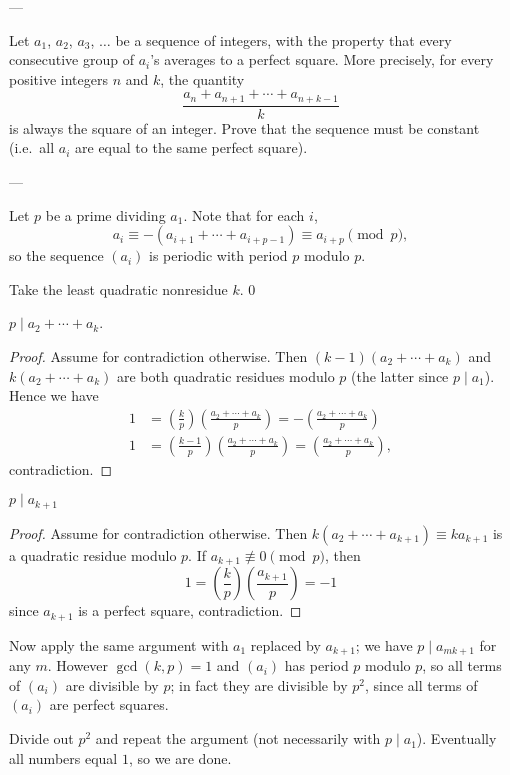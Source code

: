 
---

Let $a_1$, $a_2$, $a_3$, $\ldots$ be a sequence of integers, with the property that every consecutive group of $a_i$'s averages to a perfect square. More precisely, for every positive integers $n$ and $k$, the quantity \[\frac{a_n+a_{n+1}+\cdots+a_{n+k-1}}k\]
is always the square of an integer. Prove that the sequence must be constant (i.e.\ all $a_i$ are equal to the same perfect square).

---

Let $p$ be a prime dividing $a_1$. Note that for each $i$, \[a_i\equiv-(a_{i+1}+\cdots+a_{i+p-1})\equiv a_{i+p}\pmod p,\]
so the sequence $(a_i)$ is periodic with period $p$ modulo $p$.

Take the least quadratic nonresidue $k$.
\setcounter{iclaim}0
\begin{iclaim}
    $p\mid a_2+\cdots+a_k$.
\end{iclaim}
\begin{proof}
    Assume for contradiction otherwise. Then $(k-1)(a_2+\cdots+a_k)$ and $k(a_2+\cdots+a_k)$ are both quadratic residues modulo $p$ (the latter since $p\mid a_1$). Hence we have
    \begin{align*}
        1&=\left(\frac kp\right)\left(\frac{a_2+\cdots+a_k}p\right)=-\left(\frac{a_2+\cdots+a_k}p\right)\\
        1&=\left(\frac{k-1}p\right)\left(\frac{a_2+\cdots+a_k}p\right)=\left(\frac{a_2+\cdots+a_k}p\right),
    \end{align*}
    contradiction.
\end{proof}
\begin{iclaim}
    $p\mid a_{k+1}$
\end{iclaim}
\begin{proof}
    Assume for contradiction otherwise. Then $k(a_2+\cdots+a_{k+1})\equiv ka_{k+1}$ is a quadratic residue modulo $p$. If $a_{k+1}\not\equiv0\pmod p$, then \[1=\left(\frac kp\right)\left(\frac{a_{k+1}}p\right)=-1\]
    since $a_{k+1}$ is a perfect square, contradiction.
\end{proof}

Now apply the same argument with $a_1$ replaced by $a_{k+1}$; we have $p\mid a_{mk+1}$ for any $m$. However $\gcd(k,p)=1$ and $(a_i)$ has period $p$ modulo $p$, so all terms of $(a_i)$ are divisible by $p$; in fact they are divisible by $p^2$, since all terms of $(a_i)$ are perfect squares.

Divide out $p^2$ and repeat the argument (not necessarily with $p\mid a_1$). Eventually all numbers equal $1$, so we are done.

